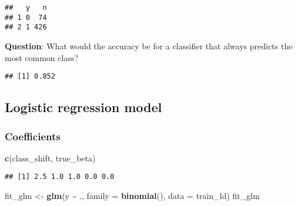 \documentclass[
]{article}
\newenvironment{Shaded}{\begin{snugshade}}{\end{snugshade}}
\newcommand{\AttributeTok}[1]{\textcolor[rgb]{0.13,0.29,0.53}{#1}}
\newcommand{\CommentTok}[1]{\textcolor[rgb]{0.56,0.35,0.01}{\textit{#1}}}
\newcommand{\DecValTok}[1]{\textcolor[rgb]{0.00,0.00,0.81}{#1}}
\newcommand{\FunctionTok}[1]{\textcolor[rgb]{0.13,0.29,0.53}{\textbf{#1}}}
\newcommand{\NormalTok}[1]{#1}
\newcommand{\OtherTok}[1]{\textcolor[rgb]{0.56,0.35,0.01}{#1}}
\newcommand{\SpecialCharTok}[1]{\textcolor[rgb]{0.81,0.36,0.00}{\textbf{#1}}}
\begin{document}
\begin{verbatim}
##   y   n
## 1 0  74
## 2 1 426
\end{verbatim}

\textbf{Question}: What would the accuracy be for a classifier that
always predicts the most common class?

\begin{Shaded}
\end{Shaded}

\begin{verbatim}
## [1] 0.852
\end{verbatim}

\subsection{Logistic regression model}\label{logistic-regression-model}

\subsubsection{Coefficients}\label{coefficients}

\begin{Shaded}
\begin{Highlighting}[]
\FunctionTok{c}\NormalTok{(class\_shift, true\_beta)}
\end{Highlighting}
\end{Shaded}

\begin{verbatim}
## [1] 2.5 1.0 1.0 0.0 0.0
\end{verbatim}

\begin{Shaded}
\begin{Highlighting}[]
\NormalTok{fit\_glm }\OtherTok{\textless{}{-}} \FunctionTok{glm}\NormalTok{(y }\SpecialCharTok{\textasciitilde{}}\NormalTok{ ., }\AttributeTok{family =} \FunctionTok{binomial}\NormalTok{(), }\AttributeTok{data =}\NormalTok{ train\_ld)}
\NormalTok{fit\_glm}
\end{Highlighting}
\end{Shaded}
\end{document}
